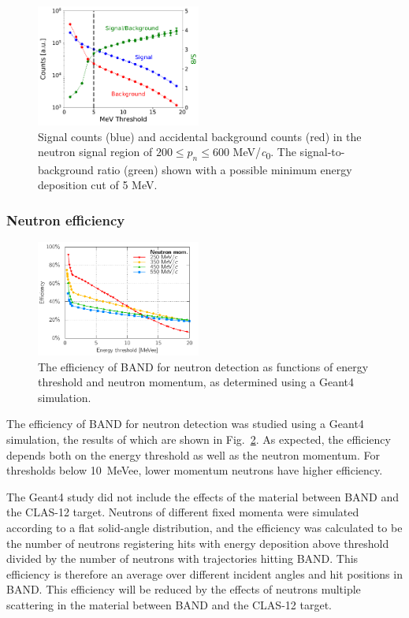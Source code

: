 \documentclass[3p,final,twocolumn]{elsarticle}
\begin{document}
\begin{figure}[tb]
	\centering
		\includegraphics[width=0.48\textwidth]{signalbackgroundratio.pdf}
	\caption{Signal counts (blue) and accidental background counts
          (red) in the neutron signal region of $200 \le p_n \le 600$ \si{\MeV/\clight}. The signal-to-background ratio (green) shown with a possible minimum energy deposition cut of 5 \si{\MeV}.}
	\label{fig:signalbackground}
\end{figure}
\subsubsection{Neutron efficiency}

\begin{figure}[tb]
	\centering
		\includegraphics[width=0.48\textwidth]{eff_geant.pdf}
	\caption{The efficiency of BAND for neutron detection as functions of energy threshold and neutron
          momentum, as determined using a Geant4 simulation.}
	\label{fig:eff}
\end{figure}

The efficiency of BAND for neutron detection was studied using a Geant4 simulation, the results of which
are shown in Fig.~\ref{fig:eff}. As expected, the efficiency depends both on the energy threshold 
as well as the neutron momentum. For thresholds below 10~MeVee, lower momentum neutrons have higher
efficiency.

The Geant4 study did not include the effects of the material between BAND
and the CLAS-12 target. Neutrons of different fixed momenta were simulated according
to a flat solid-angle distribution, and the efficiency was calculated to be the number of neutrons
registering hits with energy deposition above threshold divided by the number of neutrons with 
trajectories hitting BAND. This efficiency is therefore an average over different incident angles
and hit positions in BAND.  This efficiency will be reduced by the effects of
neutrons multiple
scattering in the material between BAND and the CLAS-12 target. 
\end{document}
